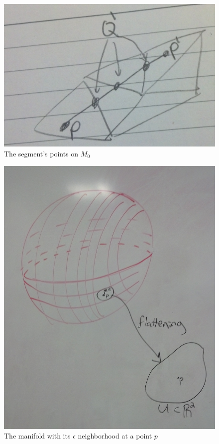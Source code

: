 \begin{figure}[ht]
\centering
\includegraphics[width=\columnwidth]{segmentonmesh.jpg}
\caption{The segment's points on $M_0$}
\label{segmentonmesh}
\end{figure}



\begin{figure}[ht]
\centering
\includegraphics[width=\columnwidth]{manifolddiagram.jpg}
\caption{The manifold with its $\epsilon$ neighborhood at a point $p$}
\label{manifolddiagram}
\end{figure}
